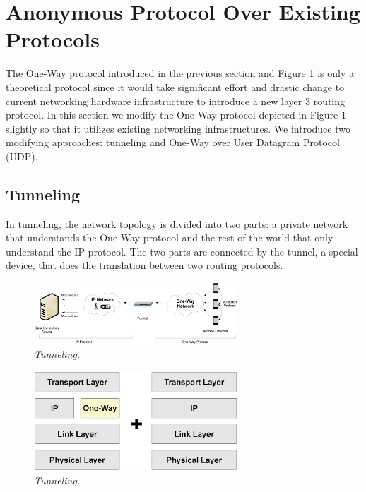 
\section{Anonymous Protocol Over Existing Protocols}\label{sec-protocol}
The One-Way protocol introduced in the previous section and Figure 1 is only
a theoretical protocol since it would take significant effort and drastic
change to current networking hardware infrastructure to introduce a new layer 3
routing protocol. In this section we modify the One-Way protocol depicted in
Figure 1 slightly so that it utilizes existing networking infrastructures. We
introduce two modifying approaches: tunneling and One-Way over User Datagram
Protocol (UDP).

\subsection{Tunneling}

In tunneling, the network topology is divided into two parts: a private
network that understands the One-Way protocol and the rest of the world that
only understand the IP protocol. The two parts are connected by the tunnel,
a special device, that does the translation between two routing protocols.

\begin{figure}[h]
\begin{center}
\includegraphics[width=3in]{figure2.eps}
\caption{\small \sl Tunneling.\label{fig:Stupendous}}
\end{center}
\end{figure}

\begin{figure}[h]
\begin{center}
\includegraphics[width=3in]{figure2b.eps}
\caption{\small \sl Tunneling.\label{fig:Stupendous}}
\end{center}
\end{figure}

